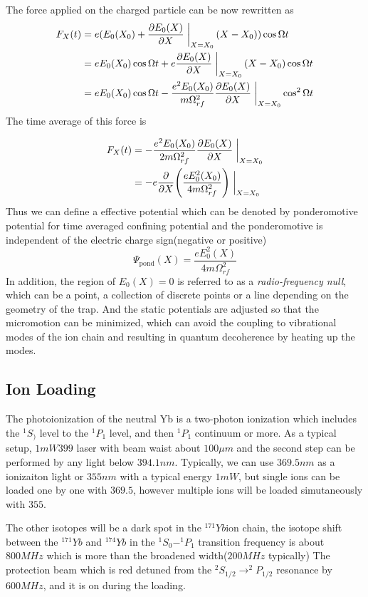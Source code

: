 The force applied on the charged particle can be now rewritten as
\begin{equation}
\begin{aligned}
    F_X(t)&=e(E_0(X_0)+\pdv{E_0(X)}{X}\eval{}_{X=X_0}\qty(X-X_0))\cos\Omega t\\
    &=eE_0(X_0)\cos\Omega t+e\pdv{E_0(X)}{X}\eval{}_{X=X_0}\qty(X-X_0)\cos\Omega t\\
    &=eE_0(X_0)\cos\Omega t-\frac{e^2E_0(X_0)}{m\Omega_{rf}^2}\pdv{E_0(X)}{X}\eval{}_{X=X_0}\cos^2\Omega t
\end{aligned}
\end{equation}
The time average of this force is

\begin{equation}\label{eq:timeaveraged}
\begin{aligned}
    F_X(t)&=-\frac{e^2E_0(X_0)}{2m\Omega_{rf}^2}\pdv{E_0(X)}{X}\eval{}_{X=X_0}\\
    &=-e\pdv{X}(\frac{eE_0^2(X_0)}{4m\Omega_{rf}^2})\eval{}_{X=X_0}
\end{aligned}
\end{equation}
Thus we can define a effective potential which can be denoted by ponderomotive potential for time averaged confining potential and the ponderomotive is independent of the electric charge sign(negative or positive)
\begin{equation}\label{eq:ponderomotive}
    \Psi_{\mathrm{pond}}(X)=\frac{eE_0^2(X)}{4m\Omega_{rf}^2}
\end{equation}
In addition, the region of $E_0(X)=0$ is referred to as a \emph{radio-frequency null}, which can be a point, a collection of discrete points or a line depending on the geometry of the trap. And the static potentials are adjusted so that the micromotion can be minimized, which can avoid the coupling to vibrational modes of the ion chain and resulting in quantum decoherence by heating up the modes.

\subsection{Ion Loading} %
\label{sub:ion_loading}
The photoionization of the neutral Yb is a two-photon ionization which includes the $^1S_)$ level to the $^1P_1$ level, and then $^1P_1$ continuum or more. As a typical setup, $1\unit{mW} 399$ laser with beam waist about $100\unit{\mu m}$ and the second step can be performed by any light below $394.1\unit{nm}$. Typically, we can use $369.5\unit{nm}$ as a ionizaiton light or $355\unit{nm}$ with a typical energy $1\unit{mW}$, but single ions can be loaded one by one with $369.5$, however multiple ions will be loaded simutaneously with $355$.

The other isotopes will be a dark spot in the $^{171}Yb$ion chain, the isotope shift between the $^{171}Yb$ and $^{174}Yb$ in the $^1S_0-^1P_1$ transition frequency is about \emph{$800\unit{MHz}$} which is more than the broadened width($200\unit{MHz}$ typically)
The protection beam which is red detuned from the $^2S_{1/2}\rightarrow ^2P_{1/2}$ resonance by $600\unit{MHz}$, and it is on during the loading.
